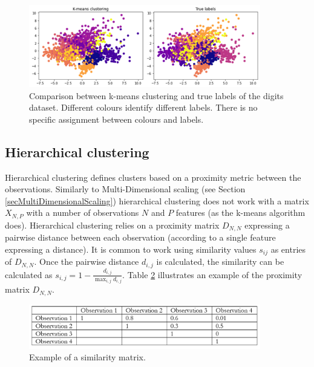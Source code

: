 \begin{figure}[hbt!]
\centering
\includegraphics[width=0.9\textwidth]{SectionLetsMath/unsupervisedLearning_figures/fig_kmeans.png}
\captionsetup{type=figure}
\caption{Comparison between k-means clustering and true labels of the digits dataset. Different colours identify different labels. There is no specific assignment between colours and labels.}
\label{fig_kmeans}
\end{figure}

\subsection{Hierarchical clustering} \label{secHierarchicalClustering}
Hierarchical clustering defines clusters based on a proximity metric between the observations. Similarly to Multi-Dimensional scaling (see Section \ref{secMultiDimensionalScaling}) hierarchical clustering does not work with a matrix $X_{N,P}$ with  a number of observations $N$ and $P$ features (as the k-means algorithm does). Hierarchical clustering relies on a proximity matrix $D_{N,N}$ expressing a pairwise distance between each observation (according to a single feature expressing a distance).  It is common to work using similarity values $s_{ij}$ as entries of $D_{N,N}$. Once the pairwise distance $d_{i,j}$ is calculated, the similarity can be calculated as $s_{i,j}=1-\frac{d_{i,j}}{\max_{i,j}{d_{i,j}}}$. Table \ref{tab_similarityMatrix} illustrates an example of the proximity matrix $D_{N,N}$.

\begin{figure}[hbt!]
\centering
\includegraphics[width=0.9\textwidth]{SectionLetsMath/unsupervisedLearning_figures/tab_similarityMatrix.png}
\captionsetup{type=table}
\caption{Example of a similarity matrix.}
\label{tab_similarityMatrix}
\end{figure}

